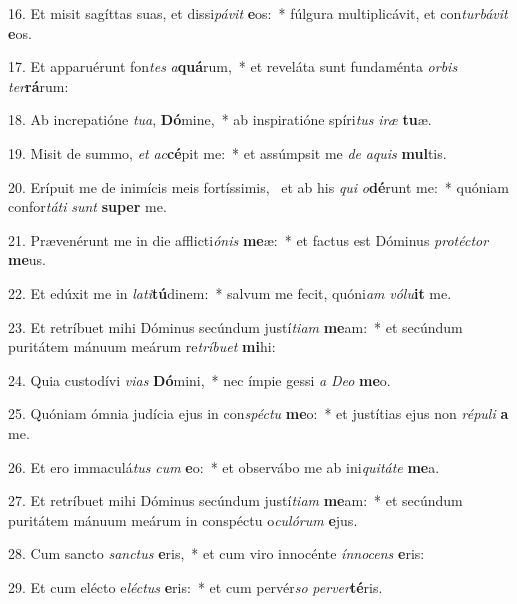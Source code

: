 16. Et misit sagíttas suas, et dissi\textit{pá}\textit{vit} \textbf{e}os:~*  fúlgura multiplicávit, et con\textit{tur}\textit{bá}\textit{vit} \textbf{e}os.\

17. Et apparuérunt fon\textit{tes} \textit{a}\textbf{quá}rum,~*  et reveláta sunt fundaménta \textit{or}\textit{bis} \textit{ter}\textbf{rá}rum:\

18. Ab increpatióne \textit{tu}\textit{a}, \textbf{Dó}mine,~*  ab inspiratióne spíri\textit{tus} \textit{i}\textit{ræ} \textbf{tu}æ.\

19. Misit de summo, \textit{et} \textit{ac}\textbf{cé}pit me:~*  et assúmpsit me \textit{de} \textit{a}\textit{quis} \textbf{mul}tis.\

20. Erípuit me de inimícis meis fortíssimis, \dag\  et ab his \textit{qui} \textit{o}\textbf{dé}runt me:~*  quóniam confor\textit{tá}\textit{ti} \textit{sunt} \textbf{su}\textbf{per} me.\

21. Prævenérunt me in die afflicti\textit{ó}\textit{nis} \textbf{me}æ:~*  et factus est Dóminus \textit{pro}\textit{téc}\textit{tor} \textbf{me}us.\

22. Et edúxit me in \textit{la}\textit{ti}\textbf{tú}dinem:~*  salvum me fecit, quóni\textit{am} \textit{vó}\textit{lu}\textbf{it} me.\

23. Et retríbuet mihi Dóminus secúndum justí\textit{ti}\textit{am} \textbf{me}am:~*  et secúndum puritátem mánuum meárum re\textit{trí}\textit{bu}\textit{et} \textbf{mi}hi:\

24. Quia custodívi \textit{vi}\textit{as} \textbf{Dó}mini,~*  nec ímpie gessi \textit{a} \textit{De}\textit{o} \textbf{me}o.\

25. Quóniam ómnia judícia ejus in con\textit{spéc}\textit{tu} \textbf{me}o:~*  et justítias ejus non \textit{ré}\textit{pu}\textit{li} \textbf{a} me.\

26. Et ero immaculá\textit{tus} \textit{cum} \textbf{e}o:~*  et observábo me ab ini\textit{qui}\textit{tá}\textit{te} \textbf{me}a.\

27. Et retríbuet mihi Dóminus secúndum justí\textit{ti}\textit{am} \textbf{me}am:~*  et secúndum puritátem mánuum meárum in conspéctu o\textit{cu}\textit{ló}\textit{rum} \textbf{e}jus.\

28. Cum sancto \textit{sanc}\textit{tus} \textbf{e}ris,~*  et cum viro innocénte \textit{ín}\textit{no}\textit{cens} \textbf{e}ris:\

29. Et cum elécto e\textit{léc}\textit{tus} \textbf{e}ris:~*  et cum pervér\textit{so} \textit{per}\textit{ver}\textbf{té}ris.\

